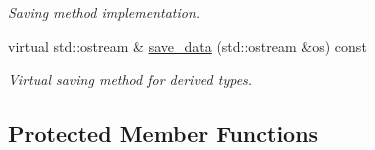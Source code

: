 \begin{DoxyCompactItemize}
\begin{DoxyCompactList}\small\item\em Saving method implementation. \end{DoxyCompactList}\item 
\hypertarget{a00441_a2cf186fa6b50db385a51bbe1fa517254}{virtual std\-::ostream \& \hyperlink{a00441_a2cf186fa6b50db385a51bbe1fa517254}{save\-\_\-data} (std\-::ostream \&os) const }\label{a00441_a2cf186fa6b50db385a51bbe1fa517254}

\begin{DoxyCompactList}\small\item\em Virtual saving method for derived types. \end{DoxyCompactList}\end{DoxyCompactItemize}
\subsection*{Protected Member Functions}
